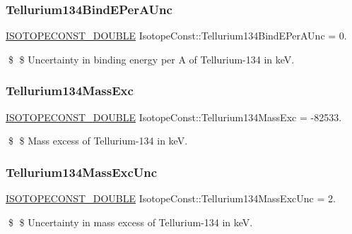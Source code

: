 \subsubsection{\texorpdfstring{Tellurium134\+Bind\+E\+Per\+A\+Unc}{Tellurium134BindEPerAUnc}}
{\footnotesize\ttfamily \mbox{\hyperlink{group___isotope_const-_macros_ga8f45a7272ce02c0b4c65c44636ed719a}{I\+S\+O\+T\+O\+P\+E\+C\+O\+N\+S\+T\+\_\+\+D\+O\+U\+B\+LE}} Isotope\+Const\+::\+Tellurium134\+Bind\+E\+Per\+A\+Unc = 0.}

\$ \$ Uncertainty in binding energy per A of Tellurium-\/134 in keV. \mbox{\label{group___isotope_const-_tellurium-_te134_gac9723bdae578044fb910af4497255407}} 
\subsubsection{\texorpdfstring{Tellurium134\+Mass\+Exc}{Tellurium134MassExc}}
{\footnotesize\ttfamily \mbox{\hyperlink{group___isotope_const-_macros_ga8f45a7272ce02c0b4c65c44636ed719a}{I\+S\+O\+T\+O\+P\+E\+C\+O\+N\+S\+T\+\_\+\+D\+O\+U\+B\+LE}} Isotope\+Const\+::\+Tellurium134\+Mass\+Exc = -\/82533.}

\$ \$ Mass excess of Tellurium-\/134 in keV. \mbox{\label{group___isotope_const-_tellurium-_te134_ga6c00045dc468297517c7189a0119d4d3}} 
\subsubsection{\texorpdfstring{Tellurium134\+Mass\+Exc\+Unc}{Tellurium134MassExcUnc}}
{\footnotesize\ttfamily \mbox{\hyperlink{group___isotope_const-_macros_ga8f45a7272ce02c0b4c65c44636ed719a}{I\+S\+O\+T\+O\+P\+E\+C\+O\+N\+S\+T\+\_\+\+D\+O\+U\+B\+LE}} Isotope\+Const\+::\+Tellurium134\+Mass\+Exc\+Unc = 2.}

\$ \$ Uncertainty in mass excess of Tellurium-\/134 in keV. \mbox{\label{group___isotope_const-_tellurium-_te134_gae31c9ec1de4e2b1cee5be92acf45fbb4}} 

